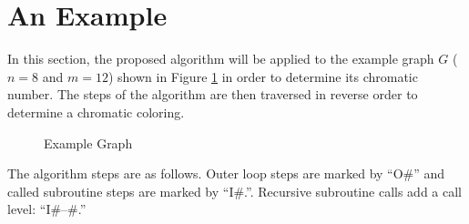 \section{An Example}

In this section, the proposed algorithm will be applied to the example graph \(G\) (\(n=8\) and \(m=12\)) shown in
Figure \ref{fig:example} in order to determine its chromatic number.  The steps of the algorithm are then traversed
in reverse order to determine a chromatic coloring.

\begin{figure}[h]
  \label{fig:example}
  \begin{center}
  \end{center}
  \caption{Example Graph}
\end{figure}

The algorithm steps are as follows.  Outer loop steps are marked by ``O\#'' and called subroutine steps are marked by
``I\#.''.  Recursive subroutine calls add a call level: ``I\#--\#.''

